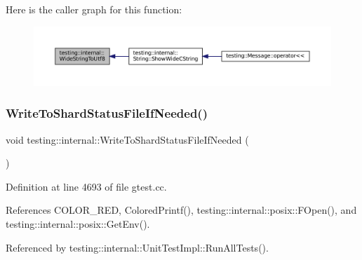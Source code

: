 Here is the caller graph for this function\+:
\nopagebreak
\begin{figure}[H]
\begin{center}
\leavevmode
\includegraphics[width=350pt]{namespacetesting_1_1internal_a05b8c86ff38243f34d8f839a0eadefb1_icgraph}
\end{center}
\end{figure}
\mbox{\label{namespacetesting_1_1internal_a19b35b39782d41e6ef76e1910a3a502e}} 
\subsubsection{\texorpdfstring{Write\+To\+Shard\+Status\+File\+If\+Needed()}{WriteToShardStatusFileIfNeeded()}}
{\footnotesize\ttfamily void testing\+::internal\+::\+Write\+To\+Shard\+Status\+File\+If\+Needed (\begin{DoxyParamCaption}{ }\end{DoxyParamCaption})}



Definition at line 4693 of file gtest.\+cc.



References C\+O\+L\+O\+R\+\_\+\+R\+ED, Colored\+Printf(), testing\+::internal\+::posix\+::\+F\+Open(), and testing\+::internal\+::posix\+::\+Get\+Env().



Referenced by testing\+::internal\+::\+Unit\+Test\+Impl\+::\+Run\+All\+Tests().


